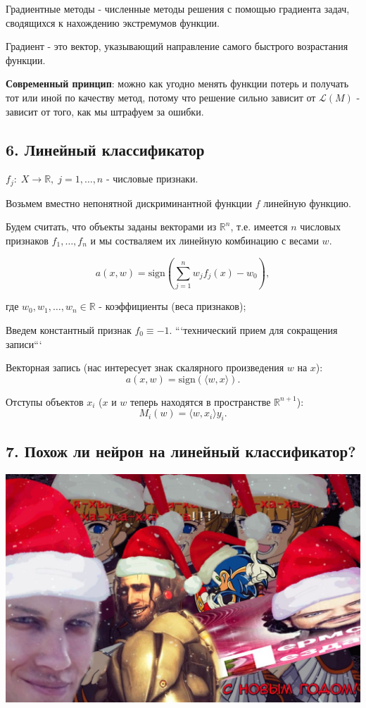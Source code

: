 Градиентные методы - численные методы решения с помощью градиента задач,
сводящихся к нахождению экстремумов функции.

Градиент - это вектор, указывающий направление самого быстрого возрастания
функции.

\textbf{Современный принцип}: можно как угодно менять функции потерь и получать
тот или иной по качеству метод, потому что решение сильно зависит от
$\mathscr{L}{(M)}$ - зависит от того, как мы штрафуем за ошибки.

\subsection{6. Линейный классификатор}

$f_j \! : \; X \rightarrow \mathbb{R}, \; j = 1, \ldots, n$ - числовые признаки.

Возьмем вместно непонятной дискриминантной функции $f$ линейную функцию.

Будем считать, что объекты заданы векторами из $\mathbb{R}^n$, т.е. имеется $n$
числовых признаков $f_1, \ldots, f_n$ и мы состваляем их линейную
комбинацию с весами $w$.

$$a{(x, w)} = \text{sign}{\left( \sum_{j=1}^{n}{w_j f_j{(x)}} - w_0 \right)},$$

где $w_0, w_1, \ldots, w_n \in \mathbb{R}$ - коэффициенты (веса признаков);

Введем константный признак $f_0 \equiv -1$. ```технический прием для сокращения записи```

Векторная запись (нас интересует знак скалярного произведения $w$ на $x$):
$$a{(x, w)} = \text{sign}{\left( {\langle w, x\rangle} \right)}.$$

Отступы объектов $x_i$
($x$ и $w$ теперь находятся в пространстве $\mathbb{R}^{n+1}$):
$$M_i{(w)} = {\langle w, x_i \rangle} y_i.$$

\subsection{7. Похож ли нейрон на линейный классификатор?}

\includegraphics[scale=0.3]{figures/samplefigure.jpg}


